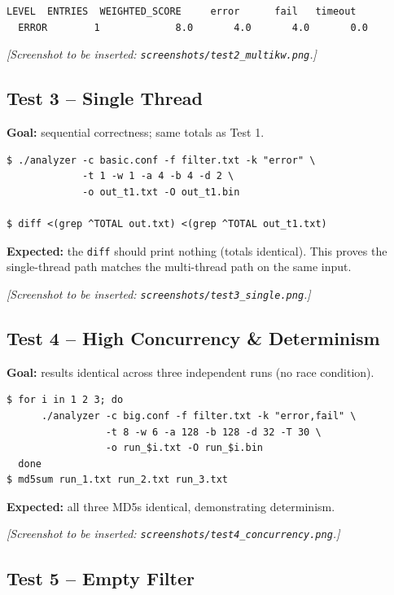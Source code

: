 \documentclass[11pt,a4paper]{article}
\newcommand{\code}[1]{\texttt{\small #1}}
\begin{document}
\begin{lstlisting}[style=Outputstyle]
  LEVEL  ENTRIES  WEIGHTED_SCORE     error      fail   timeout
  ERROR        1             8.0       4.0       4.0       0.0
\end{lstlisting}

\noindent
\textit{[Screenshot to be inserted: \code{screenshots/test2\_multikw.png}.]}

\subsection{Test 3 -- Single Thread}

\textbf{Goal:} sequential correctness; same totals as Test 1.

\begin{lstlisting}[style=Bashstyle]
$ ./analyzer -c basic.conf -f filter.txt -k "error" \
             -t 1 -w 1 -a 4 -b 4 -d 2 \
             -o out_t1.txt -O out_t1.bin

$ diff <(grep ^TOTAL out.txt) <(grep ^TOTAL out_t1.txt)
\end{lstlisting}

\textbf{Expected:} the \code{diff} should print nothing (totals
identical). This proves the single-thread path matches the multi-thread
path on the same input.

\noindent
\textit{[Screenshot to be inserted: \code{screenshots/test3\_single.png}.]}

\subsection{Test 4 -- High Concurrency \& Determinism}

\textbf{Goal:} results identical across three independent runs (no
race condition).

\begin{lstlisting}[style=Bashstyle]
$ for i in 1 2 3; do
      ./analyzer -c big.conf -f filter.txt -k "error,fail" \
                 -t 8 -w 6 -a 128 -b 128 -d 32 -T 30 \
                 -o run_$i.txt -O run_$i.bin
  done
$ md5sum run_1.txt run_2.txt run_3.txt
\end{lstlisting}

\textbf{Expected:} all three MD5s identical, demonstrating
determinism.

\noindent
\textit{[Screenshot to be inserted: \code{screenshots/test4\_concurrency.png}.]}

\subsection{Test 5 -- Empty Filter}
\end{document}
